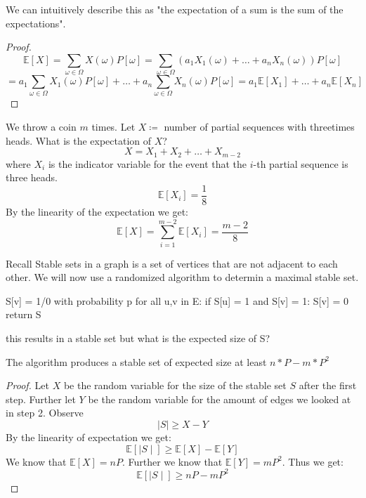 \begin{remark}
    We can intuitively describe this as "the expectation of a sum is the sum of the expectations".
\end{remark}

\begin{proof}
    $$\mathbb{E}[X] = \sum_{\omega \in \Omega} X(\omega) P[\omega] = \sum_{\omega \in \Omega} (a_1 X_1(\omega) + \dots + a_n X_n(\omega)) P[\omega]$$
    $$ = a_1 \sum_{\omega \in \Omega} X_1(\omega) P[\omega] + \dots + a_n \sum_{\omega \in \Omega} X_n(\omega) P[\omega] = a_1 \mathbb{E}[X_1] + \dots + a_n \mathbb{E}[X_n]$$
\end{proof}

\begin{example}
    We throw a coin $m$ times. Let $X \coloneqq$ number of partial sequences with threetimes heads. What is the expectation of $X$?
    $$X = X_1 + X_2 + \dots + X_{m-2}$$
    where $X_i$ is the indicator variable for the event that the $i$-th partial sequence is three heads.
    $$\mathbb{E}[X_i] = \frac{1}{8}$$
    By the linearity of the expectation we get:
    $$\mathbb{E}[X] = \sum_{i=1}^{m-2} \mathbb{E}[X_i] = \frac{m-2}{8}$$
\end{example}

\begin{remark}
    Recall Stable sets in a graph is a set of vertices that are not adjacent to each other. We will now use a randomized algorithm to determin a maximal stable set.
\end{remark}

\begin{algorithm}
S[v] = 1/0 with probability p
for all u,v in E:
    if S[u] = 1 and S[v] = 1:
        S[v] = 0
return S
\end{algorithm}

this results in a stable set but what is the expected size of S?

\begin{theorem}
    The algorithm produces a stable set of expected size at least $n*P-m*P^2$
\end{theorem}

\begin{proof}
    Let $X$ be the random variable for the size of the stable set $S$ after the first step. Further let $Y$ be the random variable for the amount of edges we looked at in step 2. Observe
    $$\mid S \mid  \geq X - Y$$
    By the linearity of expectation we get:
    $$\mathbb{E}[\mid S \mid] \geq \mathbb{E}[X] - \mathbb{E}[Y]$$
    We know that $\mathbb{E}[X] = nP$. Further we know that $\mathbb{E}[Y] = mP^2$. Thus we get:
    $$\mathbb{E}[\mid S \mid] \geq nP - mP^2$$
\end{proof}

